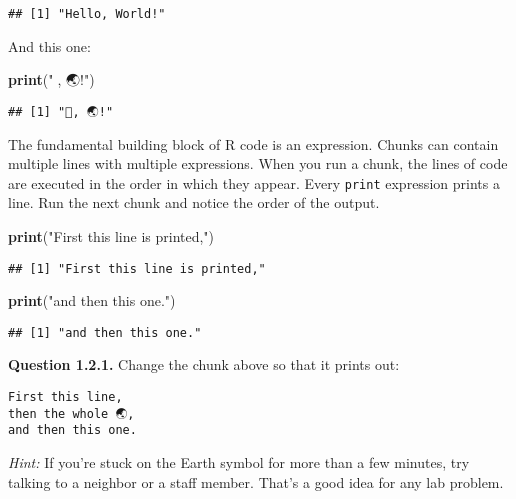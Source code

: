 \documentclass[
]{article}
\newenvironment{Shaded}{\begin{snugshade}}{\end{snugshade}}
\newcommand{\FunctionTok}[1]{\textcolor[rgb]{0.13,0.29,0.53}{\textbf{#1}}}
\newcommand{\NormalTok}[1]{#1}
\newcommand{\StringTok}[1]{\textcolor[rgb]{0.31,0.60,0.02}{#1}}
\begin{document}
\begin{verbatim}
## [1] "Hello, World!"
\end{verbatim}

And this one:

\begin{Shaded}
\begin{Highlighting}[]
\FunctionTok{print}\NormalTok{(}\StringTok{"👋, 🌏!"}\NormalTok{)}
\end{Highlighting}
\end{Shaded}

\begin{verbatim}
## [1] "👋, 🌏!"
\end{verbatim}

The fundamental building block of R code is an expression. Chunks can
contain multiple lines with multiple expressions. When you run a chunk,
the lines of code are executed in the order in which they appear. Every
\texttt{print} expression prints a line. Run the next chunk and notice
the order of the output.

\begin{Shaded}
\begin{Highlighting}[]
\FunctionTok{print}\NormalTok{(}\StringTok{"First this line is printed,"}\NormalTok{)}
\end{Highlighting}
\end{Shaded}

\begin{verbatim}
## [1] "First this line is printed,"
\end{verbatim}

\begin{Shaded}
\begin{Highlighting}[]
\FunctionTok{print}\NormalTok{(}\StringTok{"and then this one."}\NormalTok{)}
\end{Highlighting}
\end{Shaded}

\begin{verbatim}
## [1] "and then this one."
\end{verbatim}

\textbf{Question 1.2.1.} Change the chunk above so that it prints out:

\begin{verbatim}
First this line,
then the whole 🌏,
and then this one.
\end{verbatim}

\emph{Hint:} If you're stuck on the Earth symbol for more than a few
minutes, try talking to a neighbor or a staff member. That's a good idea
for any lab problem.
\end{document}

